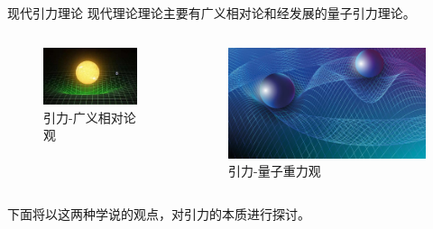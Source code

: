 \documentclass[10pt,aspectratio=43,mathserif]{beamer}
\begin{document}
\begin{frame}{现代引力理论}
    现代理论理论主要有广义相对论和经发展的量子引力理论。
    \begin{columns}
        \begin{column}{.5\linewidth}
            \centering
            \begin{figure}[htbp]
                \includegraphics[width=0.9\linewidth]{fig/123.jpg}
                \caption{引力-广义相对论观}
                \label{fig:ETgravity1}    
            \end{figure}
        \end{column}
        \hfill
        \begin{column}{.5\linewidth}
            \centering
            \begin{figure}[htbp]
                \includegraphics[width=0.9\linewidth]{fig/gravity-and-particles-1754139353-Shutterstock_Evgenia-Fux.jpg}
                \caption{引力-量子重力观}
                \label{fig:QGtwoAtoms}
            \end{figure}
        \end{column}
        \hfill
    \end{columns}
    下面将以这两种学说的观点，对引力的本质进行探讨。
\end{frame}
\end{document}
